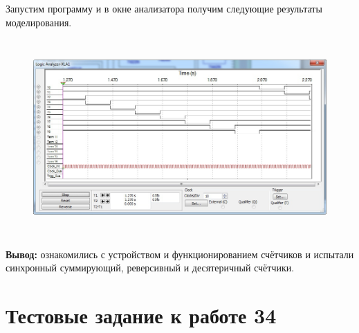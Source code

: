 \documentclass[spec, och, labwork]{shiza}
\begin{document}
Запустим программу и в окне анализатора получим следующие результаты
моделирования.

\begin{figure}[H]
    \centering
    \includegraphics[width=5.56253in,height=2.94697in]{image13.jpeg}
\end{figure}

\textbf{Вывод:} ознакомились с устройством и функционированием счётчиков
и испытали синхронный суммирующий, реверсивный и десятеричный счётчики.


\section*{Тестовые задание к работе 34}
\end{document}
